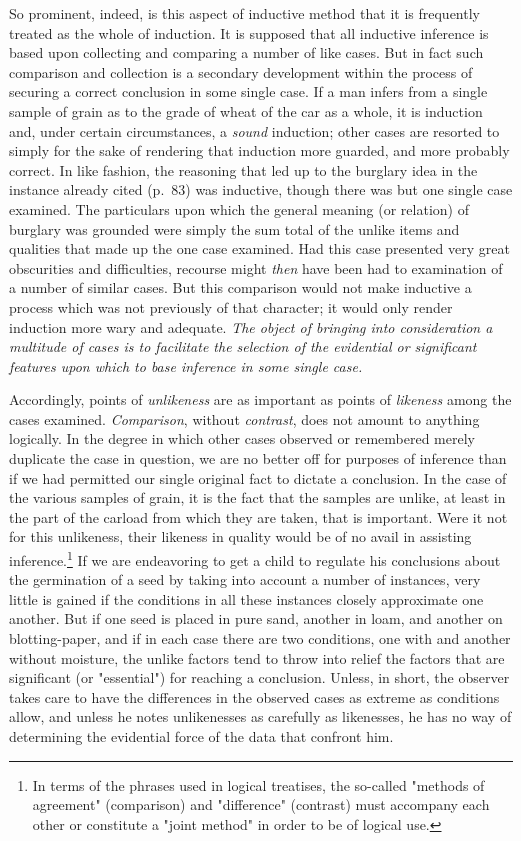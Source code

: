 \documentclass[letterpaper]{book}
\begin{document}
So prominent, indeed, is this aspect of inductive method that it is
frequently treated as the whole of induction. It is supposed that all
inductive inference is based upon collecting and comparing a number of
like cases. But in fact such comparison and collection is
a
secondary development within the process of securing a correct
conclusion in some single case. If a man infers from a single sample of
grain as to the grade of wheat of the car as a whole, it is induction
and, under certain circumstances, a \emph{sound} induction; other cases
are resorted to simply for the sake of rendering that induction more
guarded, and more probably correct. In like fashion, the reasoning that
led up to the burglary idea in the instance already cited (p.\ 83) was
inductive, though there was but one single case examined. The
particulars upon which the general meaning (or relation) of burglary was
grounded were simply the sum total of the unlike items and qualities
that made up the one case examined. Had this case presented very great
obscurities and difficulties, recourse might \emph{then} have been had
to examination of a number of similar cases. But this comparison would
not make inductive a process which was not previously of that character;
it would only render induction more wary and adequate. \emph{The object
of bringing into consideration a multitude of cases is to facilitate the
selection of the evidential or significant features upon which to base
inference in some single case.}


Accordingly, points of \emph{unlikeness} are as important as points of
\emph{likeness} among the cases examined. \emph{Comparison}, without
\emph{contrast}, does not amount to anything logically. In the degree in
which other cases observed or remembered merely duplicate the case in
question, we are no better off for purposes of inference than if we had
permitted our single original fact to dictate a conclusion. In the case
of the various samples of grain, it is the fact that the samples are
unlike, at least in the part of the carload from which they are taken,
that is important. Were it not for this unlikeness, their
likeness
in quality would be of no avail in assisting
inference.\footnote{
In terms of the phrases used in logical treatises, the so-called
"methods of agreement" (comparison) and "difference" (contrast) must
accompany each other or constitute a "joint method" in order to be of
logical use.
}
If we are endeavoring to get a child to regulate his conclusions about
the germination of a seed by taking into account a number of instances,
very little is gained if the conditions in all these instances closely
approximate one another. But if one seed is placed in pure sand, another
in loam, and another on blotting-paper, and if in each case there are
two conditions, one with and another without moisture, the unlike
factors tend to throw into relief the factors that are significant (or
"essential") for reaching a conclusion. Unless, in short, the observer
takes care to have the differences in the observed cases as extreme as
conditions allow, and unless he notes unlikenesses as carefully as
likenesses, he has no way of determining the evidential force of the
data that confront him.
\end{document}
